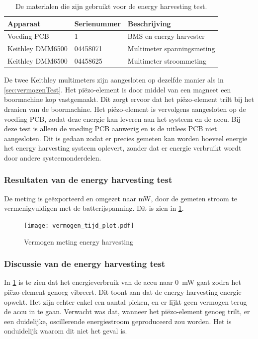 \begin{table}[!htbp]
    \centering
    \begin{tabular}{l|l|l}
        Apparaat         & Serienummer & Beschrijving \\
        \hline
        Voeding PCB      & 1           & BMS en energy harvester    \\
        Keithley DMM6500 & 04458071    & Multimeter spanningsmeting \\
        Keithley DMM6500 & 04458625    & Multimeter stroommeting    \\
        \hline
    \end{tabular}
    \caption{De materialen die zijn gebruikt voor de energy harvesting test.}
    \label{tab:testMaterialen4}
\end{table}

De twee Keithley multimeters zijn aangesloten op dezelfde manier als in \cref{sec:vermogenTest}. Het piëzo-element is door middel van een magneet een boormachine kop vastgemaakt. Dit zorgt ervoor dat het piëzo-element trilt bij het draaien van de boormachine. Het piëzo-element is vervolgens aangesloten op de voeding PCB, zodat deze energie kan leveren aan het systeem en de accu. Bij deze test is alleen de voeding PCB aanwezig en is de uitlees PCB niet aangesloten. Dit is gedaan zodat er precies gemeten kan worden hoeveel energie het energy harvesting systeem oplevert, zonder dat er energie verbruikt wordt door andere systeemonderdelen.

\subsubsection{Resultaten van de energy harvesting test}
De meting is geëxporteerd en omgezet naar mW, door de gemeten stroom te vermenigvuldigen met de batterijspanning. Dit is zien in \cref{fig:vermogenPlot}.

\begin{figure}[!htbp]
    \centering
    \texttt{[image: vermogen\_tijd\_plot.pdf]}
    \caption{Vermogen meting energy harvesting}
    \label{fig:vermogenPlot}
\end{figure}

\subsubsection{Discussie van de energy harvesting test}
In \cref{fig:vermogenPlot} is te zien dat het energieverbruik van de accu naar \qty{0}{\milli\watt} gaat zodra het piëzo-element genoeg vibreert. Dit toont aan dat de energy harvesting energie opwekt. Het zijn echter enkel een aantal pieken, en er lijkt geen vermogen terug de accu in te gaan. Verwacht was dat, wanneer het piëzo-element genoeg trilt, er een duidelijke, oscillerende energiestroom geproduceerd zou worden. Het is onduidelijk waarom dit niet het geval is.